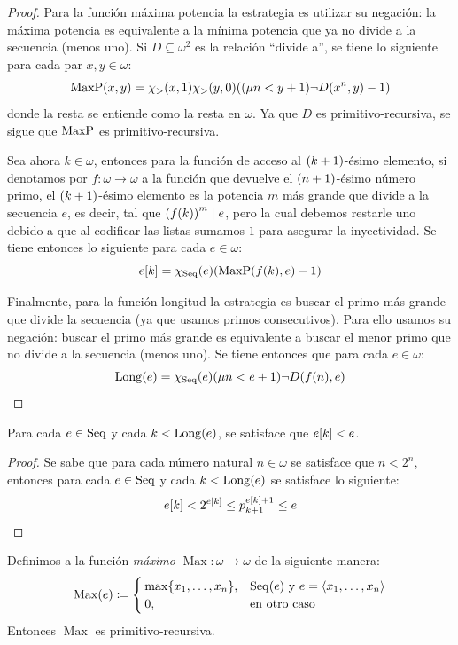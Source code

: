 \begin{proof}
	Para la función máxima potencia la estrategia es utilizar su negación: la máxima potencia es equivalente a la mínima potencia que ya no divide a la secuencia (menos uno). Si $D\subseteq\omega^{2}$ es la relación ``divide a'', se tiene lo siguiente para cada par $x, y\in\omega$:
	\[
		\MAXPOTENCIA\pa*{x, y} =\CARACTERISTICA{>}\pa*{x, 1}\CARACTERISTICA{>}\pa*{y, 0}\pa*{\pa*{\mu n < y + 1}\lnot D\pa*{x^{n}, y} - 1}
	\]
	donde la resta se entiende como la resta en $\omega$. Ya que $D$ es primitivo-recursiva, se sigue que $\MAXPOTENCIA$ es primitivo-recursiva.

	Sea ahora $k\in\omega$, entonces para la función de acceso al $\pa*{k + 1}$-ésimo elemento, si denotamos por $f:\omega\to\omega$ a la función que devuelve el $\pa*{n + 1}$-ésimo número primo, el $\pa*{k + 1}$-ésimo elemento es la potencia $m$ más grande que divide a la secuencia $e$, es decir, tal que $\pa*{f(k)}^{m}\mid e$, pero la cual debemos restarle uno debido a que al codificar las listas sumamos $1$ para asegurar la inyectividad. Se tiene entonces lo siguiente para cada $e\in\omega$:
	\[
		e\bra*{k} =\CARACTERISTICA{\SECUENCIAS}\pa*{e}\pa*{\MAXPOTENCIA\pa*{f\pa*{k}, e} - 1}
	\]

	Finalmente, para la función longitud la estrategia es buscar el primo más grande que divide la secuencia (ya que usamos primos consecutivos). Para ello usamos su negación: buscar el primo más grande es equivalente a buscar el menor primo que no divide a la secuencia (menos uno). Se tiene entonces que para cada $e\in\omega$:
	\[
		\LONGITUD\pa*{e} =\CARACTERISTICA{\SECUENCIAS}\pa*{e}\pa*{\mu n < e + 1}\lnot D\pa*{f\pa*{n}, e}
	\]
\end{proof}

\begin{theorem}
	\label{theo: ek_menor_e}
	Para cada $e\in\SECUENCIAS$ y cada $k <\LONGITUD\pa*{e}$, se satisface que $e\bra*{k} < e$.
\end{theorem}

\begin{proof}
	Se sabe que para cada número natural $n\in\omega$ se satisface que $n < 2^{n}$, entonces para cada $e\in\SECUENCIAS$ y cada $k <\LONGITUD\pa*{e}$ se satisface lo siguiente:
	\[
		e\bra*{k} < 2^{e\bra*{k}}\leq p_{k + 1}^{e\bra*{k} + 1}\leq e
	\]
\end{proof}

\begin{theorem}[Máximo]
	Definimos a la función \emph{máximo} $\operatorname{Max}:\omega\to\omega$ de la siguiente manera:
	\[
		\operatorname{Max}\pa*{e}\coloneqq
		\begin{cases}
			\max\set*{x_{1},\dotsc, x_{n}}, &\SECUENCIAS\pa*{e}\text{ y } e =\inner*{x_{1},\dotsc, x_{n}}\\
			0, &\text{en otro caso}
		\end{cases}
	\]
	Entonces $\operatorname{Max}$ es primitivo-recursiva.
\end{theorem}

